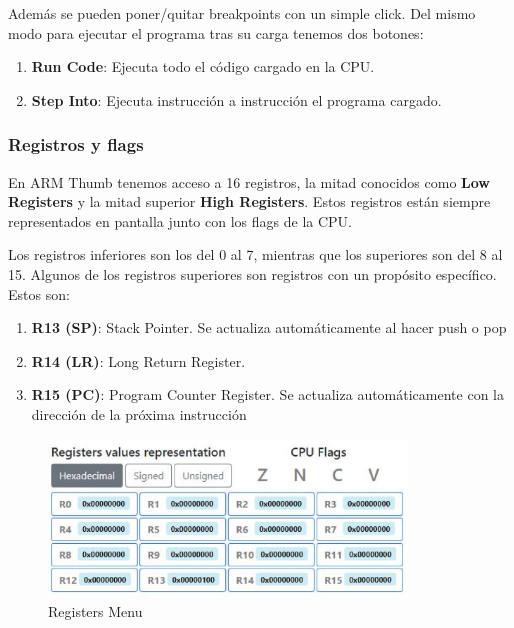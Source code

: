 {{            Además se pueden poner/quitar breakpoints con un simple click.
            Del mismo modo para ejecutar el programa tras su carga tenemos dos botones:
            \begin{enumerate}
                \item \textbf{Run Code}: Ejecuta todo el código cargado en la CPU.
                \item \textbf{Step Into}: Ejecuta instrucción a instrucción el programa cargado.
            \end{enumerate}
        }

        \subsubsection{Registros y flags}
        {
            En ARM Thumb tenemos acceso a 16 registros, la mitad conocidos como \textbf{Low Registers} y la mitad superior \textbf{High Registers}.
            Estos registros están siempre representados en pantalla junto con los flags de la CPU. 

            Los registros inferiores son los del 0 al 7, mientras que los superiores son del 8 al 15.
            Algunos de los registros superiores son registros con un propósito específico. Estos son:
            \begin{enumerate}
                \item \textbf{R13 (SP)}: Stack Pointer. Se actualiza automáticamente al hacer push o pop
                \item \textbf{R14 (LR)}: Long Return Register.
                \item \textbf{R15 (PC)}: Program Counter Register. Se actualiza automáticamente con la dirección de la próxima instrucción
            \end{enumerate}

            \begin{figure}[h]
                \centering
                \includegraphics[width=0.85\textwidth]{images/registers}
                \caption{Registers Menu}
            \end{figure}

}}
